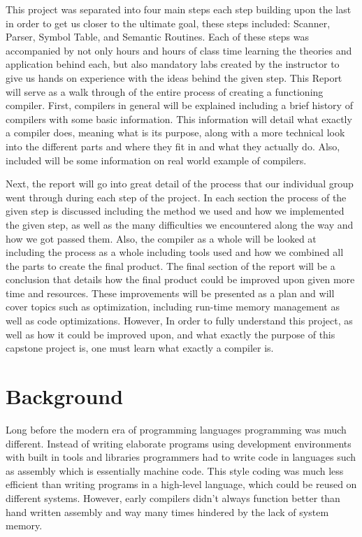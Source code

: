 \documentclass[12pt, oneside]{article}   	%
\begin{document}
This project was separated into four main steps each step building upon
the last in order to get us closer to the ultimate goal, these steps included:
Scanner, Parser, Symbol Table, and Semantic Routines. Each of these steps
was accompanied by not only hours and hours of class time learning the theories
and application behind each, but also mandatory labs created by the instructor to
give us hands on experience with the ideas behind the given step. This Report
will serve as a walk through of the entire process of creating a functioning
compiler. First, compilers in general will be explained including a brief history of
compilers with some basic information. This information will detail what exactly a
compiler does, meaning what is its purpose, along with a more technical look into
the different parts and where they fit in and what they actually do. Also, included
will be some information on real world example of compilers.

Next, the report will go into great detail of the process that our individual
group went through during each step of the project. In each section the process
of the given step is discussed including the method we used and how we
implemented the given step, as well as the many difficulties we encountered
along the way and how we got passed them. Also, the compiler as a whole will
be looked at including the process as a whole including tools used and how we
combined all the parts to create the final product. The final section of the report
will be a conclusion that details how the final product could be improved upon
given more time and resources. These improvements will be presented as a plan
and will cover topics such as optimization, including run-time memory
management as well as code optimizations. However, In order to fully understand
this project, as well as how it could be improved upon, and what exactly the
purpose of this capstone project is, one must learn what exactly a compiler is.
\section{Background}
Long before the modern era of programming languages programming was
much different. Instead of writing elaborate programs using development
environments with built in tools and libraries programmers had to
write code in languages such as assembly which is essentially machine code.
This style coding was much less efficient than writing programs in a high-level
language, which could be reused on different systems. However, early compilers
didn't always function better than hand written assembly and way many times
hindered by the lack of system memory.
\end{document}
